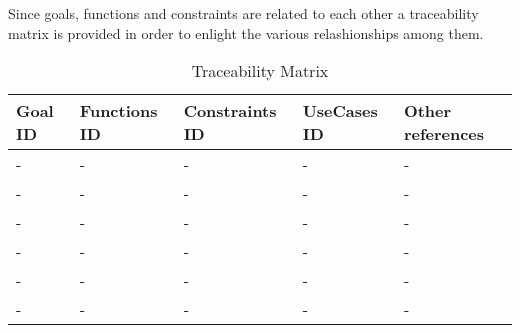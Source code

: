 Since goals, functions and constraints are related to each other a traceability matrix is provided in order to enlight the various relashionships among them.
\begin{flushleft}

\begin{table}[htp]

\begin{tabular}{l|l|l|l|l|}
\hline
Goal ID&Functions ID&Constraints ID&UseCases ID&Other references\\
\hline
-&-&-&-&-\\
\hline
-&-&-&-&-\\
\hline
-&-&-&-&-\\
\hline
-&-&-&-&-\\
\hline
-&-&-&-&-\\
\hline
-&-&-&-&-\\
\hline

\end{tabular}

\caption{Traceability Matrix } 

\end{table}

\end{flushleft}